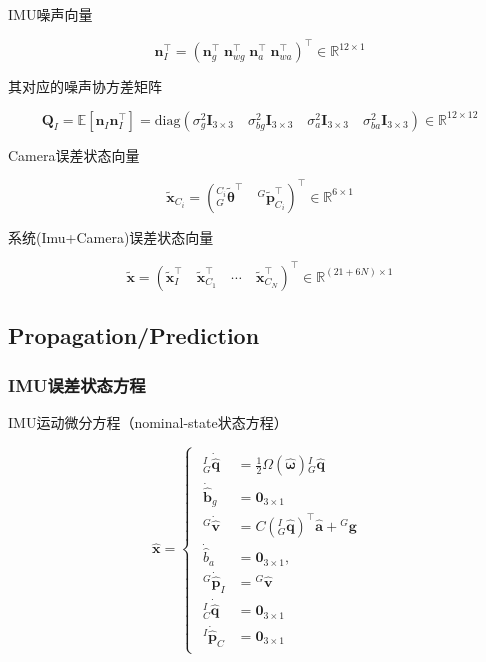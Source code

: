 \documentclass[12pt,a4paper]{article}
\begin{document}
IMU噪声向量

\begin{equation*}
\mathbf{n}_I^\top = 
\left(\mathbf{n}_g^\top \; \mathbf{n}_{wg}^\top \; \mathbf{n}_a^\top \; \mathbf{n}_{wa}^\top\right)^\top
\in \mathbb{R}^{12 \times 1}
\end{equation*}

其对应的噪声协方差矩阵

\begin{equation*}
\mathbf{Q}_I 
= \mathbb{E}\left[\mathbf{n}_I^{}\mathbf{n}_I^\top\right]
= \text{diag}\left( 
\sigma_{g}^2  \mathbf{I}_{3\times3 } \quad
\sigma_{bg}^2 \mathbf{I}_{3\times3 } \quad
\sigma_{a}^2  \mathbf{I}_{3\times3 } \quad
\sigma_{ba}^2 \mathbf{I}_{3\times3 } 
\right)
\in \mathbb{R}^{12 \times 12}
\end{equation*}

Camera误差状态向量

\begin{equation*}
\tilde{\mathbf{x}}_{C_i} = 
\left(
{}^{C_i}_G\tilde{\boldsymbol{\theta}}^\top \quad
{}^G\tilde{\mathbf{p}}_{C_i}^\top
\right)^\top
\in \mathbb{R}^{6 \times 1}
\end{equation*}

系统(Imu+Camera)误差状态向量

\begin{equation*}
\tilde{\mathbf{x}} = 
\left(
\tilde{\mathbf{x}}_I^\top \quad
\tilde{\mathbf{x}}_{C_1}^\top \quad
\cdots \quad 
\tilde{\mathbf{x}}_{C_N}^\top
\right)^\top
\in \mathbb{R}^{(21+6N) \times 1}
\end{equation*}


\subsection{Propagation/Prediction}

\subsubsection{IMU误差状态方程}

IMU运动微分方程（nominal-state状态方程）

\begin{equation}
\label{equ:imu_diff_func_nominal_state}
\hat{\mathbf{x}} = 
\begin{cases}
\begin{aligned}
{}^I_G\dot{\hat{\mathbf{q}}} &= \frac{1}{2}\Omega(\hat{\boldsymbol{\omega}}) {}^I_G\hat{\mathbf{q}} \\
\dot{\hat{\mathbf{b}}}_g &= \mathbf{0}_{3\times 1} \\
{}^G\dot{\hat{\mathbf{v}}} &= C\left({}^I_G\hat{\mathbf{q}}\right)^\top \hat{\mathbf{a}} + {}^G\mathbf{g} \\
\dot{\hat{b}}_a &= \mathbf{0}_{3\times 1}, \\
{}^G\dot{\hat{\mathbf{p}}}_I &= {}^G\hat{\mathbf{v}} \\
{}^I_C\dot{\hat{\mathbf{q}}} &= \mathbf{0}_{3\times 1} \\
{}^I\dot{\hat{\mathbf{p}}}_C &= \mathbf{0}_{3\times 1}
\end{aligned}
\end{cases}
\end{equation}
\end{document}
